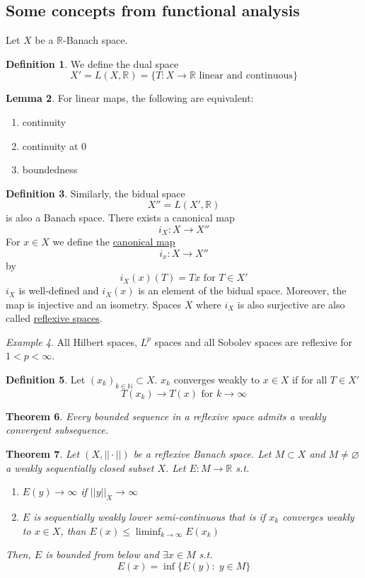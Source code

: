 \documentclass[a4paper, 12pt]{article}
\theoremstyle{plain}
\newtheorem{theorem}{Theorem}[section] %
\theoremstyle{definition}
\newtheorem{definition}[theorem]{Definition} %
\theoremstyle{lemma}
\newtheorem{lemma}[theorem]{Lemma}
\theoremstyle{remark}
\theoremstyle{corollary}
\theoremstyle{example}
\newtheorem{example}[theorem]{Example}
\begin{document}
	\subsection{Some concepts from functional analysis}
	Let $X$ be a $\mathbb{R}$-Banach space.\\
	\begin{definition}
		We define the dual space \[X' = L(X,\mathbb{R}) = \{T: X \to \mathbb{R} \text{ linear and continuous}\}\]
	\end{definition}
	\begin{lemma}
		For linear maps, the following are equivalent:
		\begin{enumerate}
			\item continuity
			\item continuity at 0
			\item boundedness
		\end{enumerate}
	\end{lemma}
	\begin{definition}
		Similarly, the bidual space \[X'' = L(X', \mathbb{R})\] is also a Banach space. There exists a canonical map \[i_X: X \to X''\] For $x \in X$ we define the \underline{canonical map} \[i_x: X \to X''\] by \[i_X(x)(T) = Tx \text{ for } T \in X'\] $i_X$ is well-defined and $i_X(x)$ is an element of the bidual space. Moreover, the map is injective and an isometry. Spaces $X$ where $i_X$ is also surjective are also called \underline{reflexive spaces}.
	\end{definition}
	\begin{example}
		All Hilbert spaces, $L^p$ spaces and all Sobolev spaces are reflexive for $1<p<\infty$.
	\end{example}
	\begin{definition}
		Let $(x_k)_{k \in \mathbb{N}} \subset X$. $x_k$ converges weakly to $x \in X$ if for all $T \in X'$ \[T(x_k) \to T(x) \text{ for } k \to \infty\] 
	\end{definition}
	\begin{theorem}
		Every bounded sequence in a reflexive space admits a weakly convergent subsequence.
	\end{theorem}
	\begin{theorem}
		Let $(X, ||\cdot ||)$ be a reflexive Banach space. Let $M\subset X$ and $M\neq \varnothing$ a weakly sequentially closed subset $X$. Let $E:M \to \mathbb{R}$ s.t. \begin{enumerate}
			\item $E(y) \to \infty$ if $||y||_X \to \infty$
			\item $E$ is sequentially weakly lower semi-continuous that is if $x_k$ converges weakly to $x \in X$, than $E(x) \leq \liminf_{k \to \infty} E(x_k)$
		\end{enumerate}
		Then, $E$ is bounded from below and $\exists x \in M$ s.t. \[E(x) = \inf\{E(y): \; y \in M\}\]
	\end{theorem}
\end{document}
